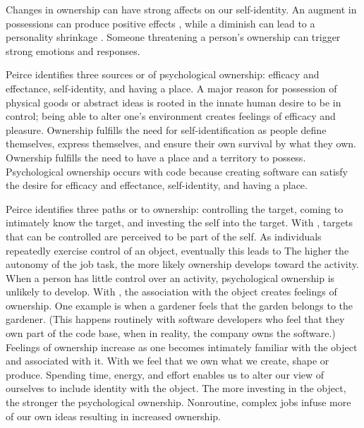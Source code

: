 Changes in ownership can have strong affects on our self-identity. An augment in possessions can produce positive effects \cite{Formanek1994}, while a diminish can lead to a personality shrinkage \cite{James1890}. Someone threatening a person's ownership can trigger strong emotions and responses.

Peirce identifies three sources or  of psychological ownership: efficacy and effectance, self-identity, and having a place. A major reason for possession of physical goods or abstract ideas is rooted in the innate human desire to be in control; being able to alter one's environment creates feelings of efficacy and pleasure. Ownership fulfills the need for self-identification as people define themselves, express themselves, and ensure their own survival by what they own. Ownership fulfills the need to have a place and a territory to possess.  Psychological ownership occurs with code because creating software can satisfy the desire for efficacy and effectance, self-identity, and having a place.

Peirce identifies three paths or  to ownership: controlling the target, coming to intimately know the target, and investing the self into the target. With , targets that can be controlled are perceived to be part of the self.  As  individuals repeatedly exercise control of an object, eventually this leads to  The higher the autonomy of the job task, the more likely ownership develops toward the activity. When a person has little control over an activity, psychological ownership is unlikely to develop. With , the association with the object creates feelings of ownership. One example is when a gardener feels that the garden belongs to the gardener. (This happens routinely with software developers who feel that they own part of the code base, when in reality, the company owns the software.) Feelings of ownership increase as one becomes intimately familiar with the object and associated with it. With  we feel that we own what we create, shape or produce. Spending time, energy, and effort enables us to alter our view of ourselves to include identity with the object. The more investing in the object, the stronger the psychological ownership. Nonroutine, complex jobs infuse more of our own ideas resulting in increased ownership.

